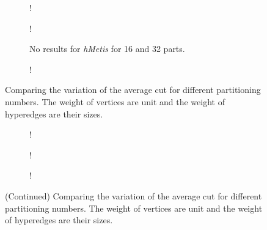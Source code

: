 \documentclass[twocolumn]{svjour3}          \smartqed
\begin{document}
\begin{figure}[t]
	\centering
	\begin{subfigure}{0.45\textwidth}
		\centering
		\captionsetup{font=small,labelfont=bf}
		\resizebox {\textwidth} {!} {
		}
	\caption{}
	\end{subfigure}
	
	\begin{subfigure}{0.45\textwidth}
		\centering
		\captionsetup{font=small,labelfont=bf}
		\resizebox {\textwidth} {!} {
	}
	\caption{No results for \textit{hMetis} for 16 and 32 parts.}
	\end{subfigure}

	\begin{subfigure}{0.45\textwidth}
		\centering
		\captionsetup{font=small,labelfont=bf}
		\resizebox {\textwidth} {!} {
	}
	\caption{}
	\end{subfigure}
		
	\caption{Comparing the variation of the average cut for different partitioning numbers. The weight of vertices are unit and the weight of hyperedges are their sizes.}\label{fig:partcut_scale_edge}
\end{figure}	

\begin{figure}[t]
	\centering
    \ContinuedFloat 

	\begin{subfigure}{0.45\textwidth}
		\centering
		\captionsetup{font=small,labelfont=bf}
		\resizebox {\textwidth} {!} {
		}
	\caption{}
	\end{subfigure}
	
	\begin{subfigure}{0.45\textwidth}
		\centering
		\captionsetup{font=small,labelfont=bf}
		\resizebox {\textwidth} {!} {
	}
	\caption{}
	\end{subfigure}

	\begin{subfigure}{0.45\textwidth}
		\centering
		\captionsetup{font=small,labelfont=bf}
		\resizebox {\textwidth} {!} {
	}
	\caption{}
	\end{subfigure}

	
\caption{(Continued) Comparing the variation of the average cut for different partitioning numbers. The weight of vertices are unit and the weight of hyperedges are their sizes.}
\end{figure}
\end{document}
